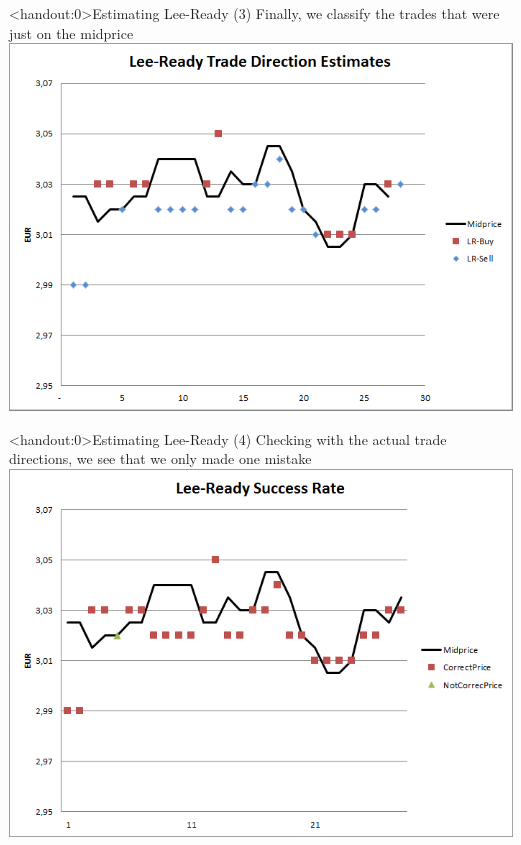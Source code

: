 \documentclass[english,10pt
,aspectratio=169
]{beamer}
\begin{document}
\begin{frame}<handout:0>{Estimating Lee-Ready (3)}
	Finally, we classify the trades that were just on the midprice
	\center
	\includegraphics[scale=0.39]{pics/L2_leereadyest}
\end{frame}


\begin{frame}<handout:0>{Estimating Lee-Ready (4)}
	Checking with the actual trade directions, we see that we only made one mistake
	\center
	\includegraphics[scale=0.39]{pics/L2_leereadysuccess}
\end{frame}
\end{document}
